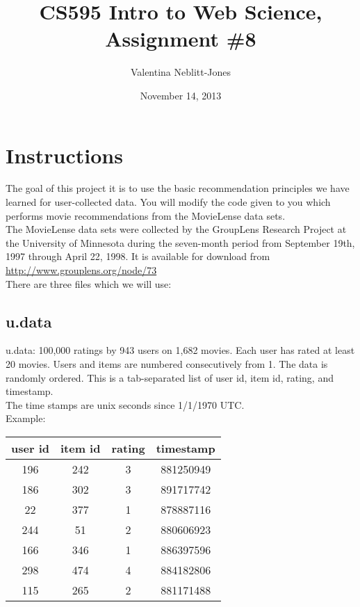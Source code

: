 \documentclass{article}
\begin{document}
\title{CS595 Intro to Web Science, Assignment \#8}
\author{Valentina Neblitt-Jones}
\date{November 14, 2013}
\maketitle



\section*{Instructions}

The goal of this project it is to use the basic recommendation principles we have learned for user-collected data. You will modify the code given to you which performs movie recommendations from the MovieLense data sets. \\

The MovieLense data sets were collected by the GroupLens Research Project at the University of Minnesota during the seven-month period from September 19th, 1997 through April 22, 1998. It is available for download from \url{http://www.grouplens.org/node/73} \\

There are three files which we will use: 

\subsection*{u.data}

u.data: 100,000 ratings by 943 users on 1,682 movies. Each user has rated at least 20 movies. Users and items are numbered consecutively from 1. The data is randomly ordered. This is a tab-separated list of user id, item id, rating, and timestamp. \\

The time stamps are unix seconds since 1/1/1970 UTC. \\

Example: 

\begin{table}[!h]
\centering
\begin{tabular}{c c c c}
user id & item id &  rating & timestamp \\
\hline
196 & 242 & 3 & 881250949 \\
186 & 302 & 3 & 891717742 \\
22 & 377 & 1 & 878887116 \\
244 & 51 & 2 & 880606923 \\
166 & 346 & 1 & 886397596 \\
298 & 474 & 4 & 884182806 \\
115 & 265 & 2 & 881171488 \\
\end{tabular}
\end{table}
\end{document}
